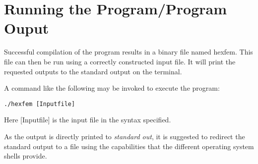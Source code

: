 \section{Running the Program/Program Ouput}

Successful compilation of the program results in a binary file
named hexfem.  This file can then be run using a correctly constructed
input file. It will print the requested outputs to the standard output
on the terminal.

A command like the following may be invoked to execute the program:

\begin{lstlisting}
./hexfem [Inputfile]
\end{lstlisting}
Here [Inputfile] is the input file in the syntax specified.

As the output is directly printed to \emph{standard out},
it is suggested to redirect the standard output to a file
using the capabilities that the different operating system shells
provide.
